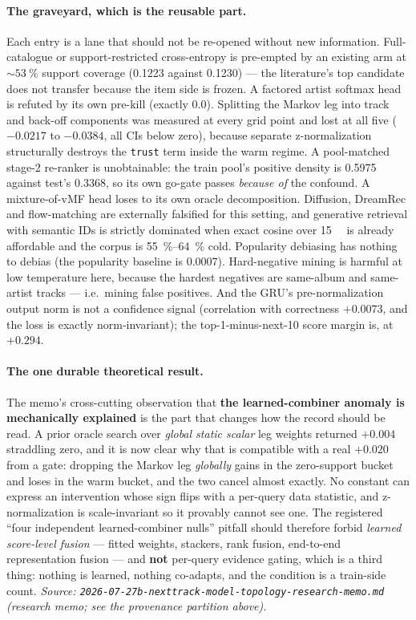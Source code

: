 \documentclass[11pt]{article}
\begin{document}
\paragraph{The graveyard, which is the reusable part.} Each entry is a lane that
should not be re-opened without new information. Full-catalogue or
support-restricted cross-entropy is pre-empted by an existing arm at
${\sim}\SI{53}{\percent}$ support coverage (\num{0.1223} against \num{0.1230}) ---
the literature's top candidate does not transfer because the item side is frozen.
A factored artist softmax head is refuted by its own pre-kill (exactly \num{0.0}).
Splitting the Markov leg into track and back-off components was measured at every
grid point and lost at all five ($-\num{0.0217}$ to $-\num{0.0384}$, all CIs below
zero), because separate z-normalization structurally destroys the \texttt{trust}
term inside the warm regime. A pool-matched stage-2 re-ranker is unobtainable: the
train pool's positive density is \num{0.5975} against test's \num{0.3368}, so its
own go-gate passes \emph{because of} the confound. A mixture-of-vMF head loses to
its own oracle decomposition. Diffusion, DreamRec and flow-matching are
externally falsified for this setting, and generative retrieval with semantic IDs
is strictly dominated when exact cosine over \SI{15}{\mega\byte} is already
affordable and the corpus is \SIrange{55}{64}{\percent} cold. Popularity
debiasing has nothing to debias (the popularity baseline is \num{0.0007}).
Hard-negative mining is harmful at low temperature here, because the hardest
negatives are same-album and same-artist tracks --- i.e.\ mining false positives.
And the GRU's pre-normalization output norm is not a confidence signal
(correlation with correctness $+\num{0.0073}$, and the loss is exactly
norm-invariant); the top-1-minus-next-10 score margin is, at $+\num{0.294}$.

\paragraph{The one durable theoretical result.} The memo's cross-cutting
observation that \textbf{the learned-combiner anomaly is mechanically explained}
is the part that changes how the record should be read. A prior oracle search over
\emph{global static scalar} leg weights returned $+\num{0.004}$ straddling zero,
and it is now clear why that is compatible with a real $+\num{0.020}$ from a
gate: dropping the Markov leg \emph{globally} gains in the zero-support bucket and
loses in the warm bucket, and the two cancel almost exactly. No constant can
express an intervention whose sign flips with a per-query data statistic, and
z-normalization is scale-invariant so it provably cannot see one. The registered
``four independent learned-combiner nulls'' pitfall should therefore forbid
\emph{learned score-level fusion} --- fitted weights, stackers, rank fusion,
end-to-end representation fusion --- and \textbf{not} per-query evidence gating,
which is a third thing: nothing is learned, nothing co-adapts, and the condition
is a train-side count.
\emph{Source: \texttt{2026-07-27b-nexttrack-model-topology-research-memo.md}
(research memo; see the provenance partition above).}
\end{document}
